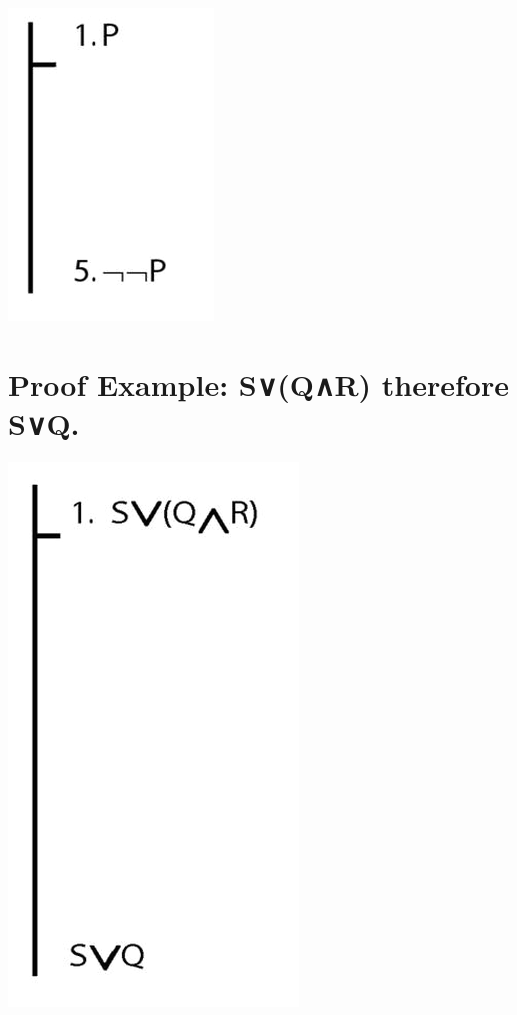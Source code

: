 \documentclass[12pt]{extarticle}
\begin{document}
\begin{multicols*}{3}
\begin{center}
\includegraphics[scale=0.3]{img/unit_823_proof.png}
\end{center}
 
 
\section{Proof Example: S∨(Q∧R) therefore S∨Q.}
 
\begin{center}
\includegraphics[scale=0.3]{img/unit_824_proof.png}
\end{center}
\vfill
\begin{minipage}{\columnwidth}

\end{minipage}
\end{multicols*}
\end{document}
